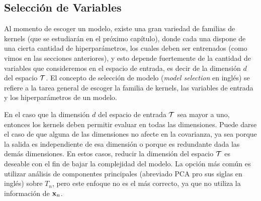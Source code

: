 \subsection{Selección de Variables}

Al momento de escoger un modelo, existe una gran variedad de familias de kernels (que se estudiarán en el próximo capítulo), donde cada una dispone de una cierta cantidad de hiperparámetros, los cuales deben ser entrenados (como vimos en las secciones anteriores), y esto depende fuertemente de la cantidad de variables que consideremos en el espacio de entrada, es decir de la dimensión \(d\) del espacio \(\mathcal{T}\). El concepto de selección de modelo (\emph{model selection} en inglés) se refiere a la tarea general de escoger la familia de kernels, las variables de entrada y los hiperparámetros de un modelo.

En el caso que la dimensión \(d\) del espacio de entrada \(\mathcal{T}\) sea mayor a uno, entonces los kernels deben permitir evaluar en todas las dimensiones. Puede darse el caso de que alguna de las dimensiones no afecte en la covarianza, ya sea porque la salida es independiente de esa dimensión o porque es redundante dada las demás dimensiones. En estos casos, reducir la dimensión del espacio \(\mathcal{T}\) es deseable con el fin de bajar la complejidad del modelo. La opción más común es utilizar análisis de componentes principales (abreviado PCA pro sus siglas en inglés) sobre \(T_n\), pero este enfoque no es el más correcto, ya que no utiliza la información de \(\mathbf{x}_n\).

